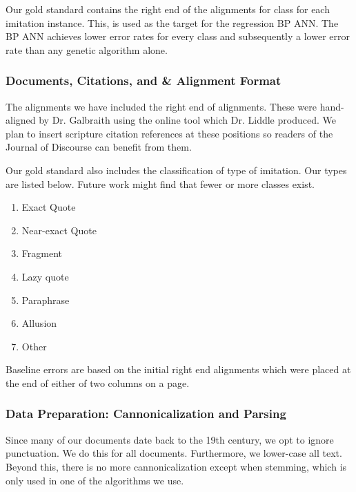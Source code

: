 Our gold standard contains the right end of the alignments for class for each imitation instance. This, is used as the target for the regression BP ANN. The BP ANN achieves lower error rates for every class and subsequently a lower error rate than any genetic algorithm alone. %


\subsubsection{Documents, Citations, and \& Alignment Format}
The alignments we have included the right end of alignments. These were hand-aligned by Dr. Galbraith using the online tool which Dr. Liddle produced. We plan to insert scripture citation references at these positions so readers of the Journal of Discourse can benefit from them.

Our gold standard also includes the classification of type of imitation. Our types are listed below. Future work might find that fewer or more classes exist.

	\begin{enumerate}
		\item Exact Quote
		\item Near-exact Quote
		\item Fragment
		\item Lazy quote
		\item Paraphrase
		\item Allusion
		\item Other%
	\end{enumerate}

Baseline errors are based on the initial right end alignments which were placed at the end of either of two columns on a page. 

\subsubsection{Data Preparation: Cannonicalization and Parsing}
Since many of our documents date back to the 19th century, we opt to ignore punctuation. We do this for all documents. Furthermore, we lower-case all text. Beyond this, there is no more cannonicalization except when stemming, which is only used in one of the algorithms we use.

